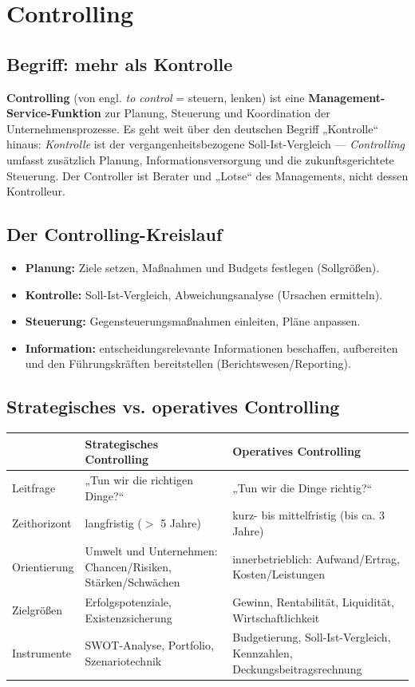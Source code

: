 \documentclass[11pt, a4paper]{article}
\begin{document}
\section{Controlling}

\subsection{Begriff: mehr als Kontrolle}

\textbf{Controlling} (von engl. \emph{to control} = steuern, lenken) ist eine
\textbf{Management-Service-Funktion} zur Planung, Steuerung und Koordination der
Unternehmensprozesse. Es geht weit über den deutschen Begriff „Kontrolle`` hinaus:
\emph{Kontrolle} ist der vergangenheitsbezogene Soll-Ist-Vergleich --- \emph{Controlling}
umfasst zusätzlich Planung, Informationsversorgung und die zukunftsgerichtete Steuerung.
Der Controller ist Berater und „Lotse`` des Managements, nicht dessen Kontrolleur.

\subsection{Der Controlling-Kreislauf}

\begin{itemize}
  \item \textbf{Planung:} Ziele setzen, Maßnahmen und Budgets festlegen (Sollgrößen).
  \item \textbf{Kontrolle:} Soll-Ist-Vergleich, Abweichungsanalyse (Ursachen ermitteln).
  \item \textbf{Steuerung:} Gegensteuerungsmaßnahmen einleiten, Pläne anpassen.
  \item \textbf{Information:} entscheidungsrelevante Informationen beschaffen, aufbereiten
    und den Führungskräften bereitstellen (Berichtswesen/Reporting).
\end{itemize}

\subsection{Strategisches vs. operatives Controlling}

\begin{center}
\begin{tabular}{p{3.2cm} p{5.2cm} p{5.2cm}}
 & \textbf{Strategisches Controlling} & \textbf{Operatives Controlling}\\
\hline
Leitfrage & „Tun wir die richtigen Dinge?`` & „Tun wir die Dinge richtig?``\\
Zeithorizont & langfristig ($>$ 5 Jahre) & kurz- bis mittelfristig (bis ca. 3 Jahre)\\
Orientierung & Umwelt und Unternehmen: Chancen/Risiken, Stärken/Schwächen & innerbetrieblich:
Aufwand/Ertrag, Kosten/Leistungen\\
Zielgrößen & Erfolgspotenziale, Existenzsicherung & Gewinn, Rentabilität, Liquidität,
Wirtschaftlichkeit\\
Instrumente & SWOT-Analyse, Portfolio, Szenariotechnik & Budgetierung, Soll-Ist-Vergleich,
Kennzahlen, Deckungsbeitragsrechnung\\
\end{tabular}
\end{center}
\end{document}
